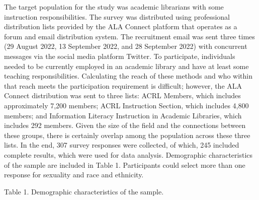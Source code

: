 \documentclass[
  twocolumn]{article}
\begin{document}
The target population for the study was academic librarians with some
instruction responsibilities. The survey was distributed using
professional distribution lists provided by the ALA Connect platform
that operates as a forum and email distribution system. The recruitment
email was sent three times (29 August 2022, 13 September 2022, and 28
September 2022) with concurrent messages via the social media platform
Twitter. To participate, individuals needed to be currently employed in
an academic library and have at least some teaching responsibilities.
Calculating the reach of these methods and who within that reach meets
the participation requirement is difficult; however, the ALA Connect
distribution was sent to three lists: ACRL Members, which includes
approximately 7,200 members; ACRL Instruction Section, which includes
4,800 members; and Information Literacy Instruction in Academic
Libraries, which includes 292 members. Given the size of the field and
the connections between these groups, there is certainly overlap among
the population across these three lists. In the end, 307 survey
responses were collected, of which, 245 included complete results, which
were used for data analysis. Demographic characteristics of the sample
are included in Table 1. Participants could select more than one
response for sexuality and race and ethnicity.

Table 1. Demographic characteristics of the sample.
\end{document}

